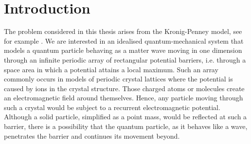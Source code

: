 \chapter{Introduction} \label{chap:1}
The problem considered in this thesis arises from the Kronig-Penney model, see for example \cite[Chapter 3]{heering2002elektrophysik}. We are interested in an idealised quantum-mechanical system that models a quantum particle behaving as a matter wave moving in one dimension through an infinite periodic array of rectangular potential barriers, i.e. through a space area in which a potential attains a local maximum. Such an array commonly occurs in models of periodic crystal lattices where the potential is caused by ions in the crystal structure. Those charged atoms or molecules create an electromagnetic field around themselves. Hence, any particle moving through such a crystal would be subject to a recurrent electromagnetic potential. Although a solid particle, simplified as a point mass, would be reflected at such a barrier, there is a possibility that the quantum particle, as it behaves like a wave, penetrates the barrier and continues its movement beyond. 
~\\

